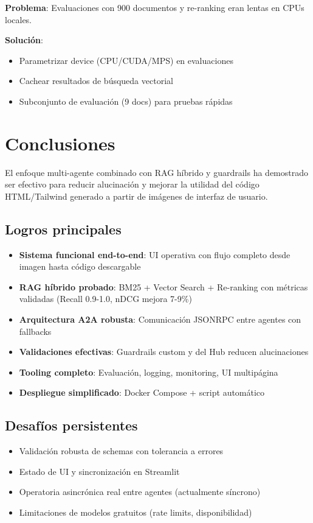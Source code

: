 \documentclass[12pt,a4paper]{article}
\begin{document}
\textbf{Problema}: Evaluaciones con 900 documentos y re-ranking eran lentas en CPUs locales.

\textbf{Solución}:
\begin{itemize}
    \item Parametrizar device (CPU/CUDA/MPS) en evaluaciones
    \item Cachear resultados de búsqueda vectorial
    \item Subconjunto de evaluación (9 docs) para pruebas rápidas
\end{itemize}

\section{Conclusiones}

El enfoque multi-agente combinado con RAG híbrido y guardrails ha demostrado ser efectivo para reducir alucinación y mejorar la utilidad del código HTML/Tailwind generado a partir de imágenes de interfaz de usuario.

\subsection{Logros principales}

\begin{itemize}
    \item \textbf{Sistema funcional end-to-end}: UI operativa con flujo completo desde imagen hasta código descargable
    \item \textbf{RAG híbrido probado}: BM25 + Vector Search + Re-ranking con métricas validadas (Recall 0.9-1.0, nDCG mejora 7-9\%)
    \item \textbf{Arquitectura A2A robusta}: Comunicación JSONRPC entre agentes con fallbacks
    \item \textbf{Validaciones efectivas}: Guardrails custom y del Hub reducen alucinaciones
    \item \textbf{Tooling completo}: Evaluación, logging, monitoring, UI multipágina
    \item \textbf{Despliegue simplificado}: Docker Compose + script automático
\end{itemize}

\subsection{Desafíos persistentes}

\begin{itemize}
    \item Validación robusta de schemas con tolerancia a errores
    \item Estado de UI y sincronización en Streamlit
    \item Operatoria asincrónica real entre agentes (actualmente síncrono)
    \item Limitaciones de modelos gratuitos (rate limits, disponibilidad)
\end{itemize}
\end{document}

